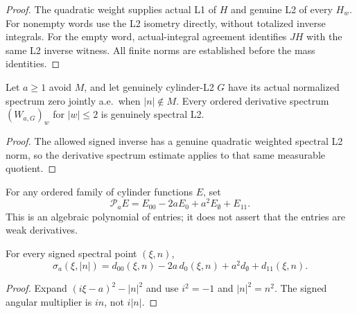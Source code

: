 \begin{proof}
\leanok
The quadratic weight supplies actual L1 of $H$ and genuine L2 of every $H_w$.
For nonempty words use the L2 isometry directly, without totalized inverse
integrals. For the empty word, actual-integral agreement identifies $JH$
with the same L2 inverse witness. All finite norms are established before the
mass identities.
\end{proof}

\begin{lemma}
\label{lem:cylinder-signed-inverse-jet-l2}
\leanok
Let $a\ge1$ avoid $M$, and let genuinely cylinder-L2 $G$ have its actual
normalized spectrum zero jointly a.e.\ when $|n|\notin M$.
Every ordered derivative spectrum $(W_{a,G})_w$ for $|w|\le2$
is genuinely spectral L2.
\end{lemma}

\begin{proof}
\leanok
The allowed signed inverse has a genuine quadratic weighted spectral L2 norm,
so the derivative spectrum estimate applies to that same measurable quotient.
\end{proof}

\begin{definition}
\label{def:cylinder-jet-operator}
\leanok
For any ordered family of cylinder functions $E$, set
\[
 \mathcal P_aE=E_{00}-2aE_0+a^2E_\emptyset+E_{11}.
\]
This is an algebraic polynomial of entries; it does not assert that the entries
are weak derivatives.
\end{definition}

\begin{lemma}
\label{lem:cylinder-symbol-jet}
\leanok
For every signed spectral point $(\xi,n)$,
\[
 \sigma_a(\xi,|n|)
   =d_{00}(\xi,n)-2a\,d_0(\xi,n)+a^2d_\emptyset+d_{11}(\xi,n).
\]
\end{lemma}

\begin{proof}
\leanok
Expand $(i\xi-a)^2-|n|^2$ and use $i^2=-1$ and $|n|^2=n^2$.
The signed angular multiplier is $in$, not $i|n|$.
\end{proof}

